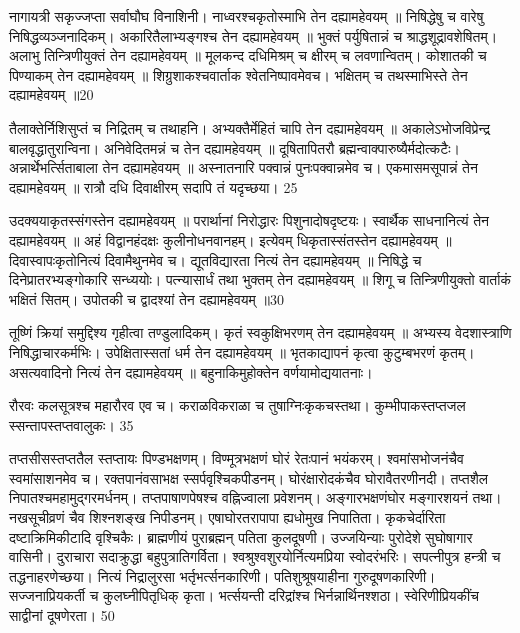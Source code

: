 नागायत्री सकृज्जप्ता सर्वाघौघ विनाशिनी।
नाध्वरश्चकृतोस्माभि तेन दह्यामहेवयम् ॥ निषिद्धेषु च वारेषु निषिद्धव्यञ्जनादिकम्।
अकारितैलाभ्यङ्गश्च तेन दह्यामहेवयम् ॥ भुक्तं पर्युषितान्नं च श्राद्धशूद्रावशेषितम्।
अलाभु तिन्त्रिणीयुक्तं तेन दह्यामहेवयम् ॥ मूलकन्द दधिमिश्रम् च क्षीरम् च लवणान्वितम्।
कोशातकी च पिण्याकम् तेन दह्यामहेवयम् ॥ शिग्रुशाकश्चवार्ताक श्वेतनिष्पावमेवच।
भक्षितम् च तथस्माभिस्ते तेन दह्यामहेवयम् ॥20

तैलाक्तेर्निशिसुप्तं च निद्रितम् च तथाहनि।
अभ्यक्तैर्मेहितं चापि तेन दह्यामहेवयम् ॥ अकालेऽभोजविप्रेन्द्र बालवृद्धातुरान्विना।
अनिवेदितमन्नं च तेन दह्यामहेवयम् ॥ दूषितापितरौ ब्रह्मन्वाक्पारुष्यैर्मदोत्कटैः।
अन्नार्थेभर्त्सिताबाला तेन दह्यामहेवयम् ॥ अस्नातनारि पक्वान्नं पुनःपक्वान्नमेव च।
एकमासमसूपान्नं तेन दह्यामहेवयम् ॥
रात्रौ दधि दिवाक्षीरम् सदापि तं यदृच्छया।
25

उदक्ययाकृतस्संगस्तेन दह्यामहेवयम् ॥ परार्थानां निरोद्धारः पिशुनादोषदृष्टयः।
स्वार्थैक साधनानित्यं तेन दह्यामहेवयम् ॥ अहं विद्वानहंदक्षः कुलीनोधनवानहम्।
इत्येवम् धिकृतास्संतस्तेन दह्यामहेवयम् ॥ दिवास्वापःकृतोनित्यं दिवामैथुनमेव च।
द्यूतविद्यारता नित्यं तेन दह्यामहेवयम् ॥ निषिद्धे च दिनेप्रातरभ्यङ्गोकारि सन्ध्ययोः।
पत्न्यासार्धं तथा भुक्तम् तेन दह्यामहेवयम् ॥ शिगू च तिन्त्रिणीयुक्तो वार्ताकं भक्षितं सितम्।
उपोतकी च द्वादश्यां तेन दह्यामहेवयम् ॥30

तूष्णिं क्रियां समुद्दिश्य गृहीत्वा तण्डुलादिकम्।
कृतं स्वकुक्षिभरणम् तेन दह्यामहेवयम् ॥ अभ्यस्य वेदशास्त्राणि निषिद्धाचारकर्मभिः।
उपेक्षितास्सतां धर्म तेन दह्यामहेवयम् ॥ भृतकाद्यापनं कृत्वा कुटुम्बभरणं कृतम्।
असत्यवादिनो नित्यं तेन दह्यामहेवयम् ॥ बहुनाकिमुहोक्तेन वर्णयामोद्ययातनाः।

रौरवः कलसूत्रश्च महारौरव एव च।
कराळविकराळा च तुषाग्निःकृकचस्तथा।
कुम्भीपाकस्तप्तजल स्सन्तापस्तप्तवालुकः।
35


तप्तसीसस्तप्ततैल स्तप्तायः पिण्डभक्षणम्।
विण्मूत्रभक्षणं घोरं रेतःपानं भयंकरम्।
श्वमांसभोजनंचैव स्वमांसाशनमेव च।
रक्तपानंवसाभक्ष स्सर्पवृश्चिकपीडनम्।
घोरंक्षारोदकंचैव घोरावैतरणीनदी।
तप्तशैल निपातश्चमहामुद्गरमर्धनम्।
तप्तपाषाणपेषश्च वह्निज्वाला प्रवेशनम्।
अङ्गारभक्षणंघोर मङ्गारशयनं तथा।
नखसूचीव्रणं चैव शिश्नशङ्ख निपीडनम्।
एषाघोरतरापापा ह्यधोमुख निपातिता।
कृकचेर्दारिता दष्टाक्रिमिकीटादि वृश्चिकैः।
ब्राह्मणीयं पुराब्रह्मन् पतिता कुलदूषणी।
उज्जयिन्याः पुरोदेशे सुघोषागार वासिनी।
दुराचारा सदाक्रुद्धा बहुपुत्रातिगर्विता।
श्वश्रुश्वशुरयोर्नित्यमप्रिया स्वोदरंभरिः।
सपत्नीपुत्र हन्त्री च तद्धनाहरणेच्छया।
नित्यं निद्रालुरसा भर्तृभर्त्सनकारिणी।
पतिशुश्रूषयाहीना गुरुदूषणकारिणी।
सज्जनाप्रियकर्ती च कुलघ्नीपितृधिक् कृता।
भर्त्सयन्ती दरिद्रांश्च भिर्नन्नार्थिनश्शठा।
स्वेरिणीप्रियकींच साद्वीनां दूषणेरता।
50

